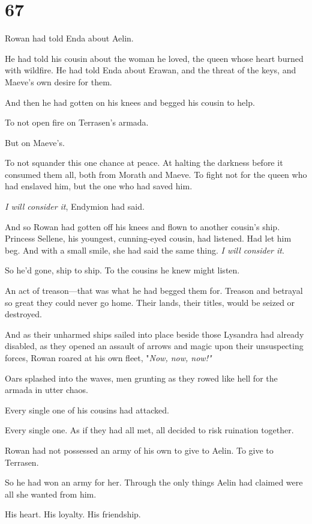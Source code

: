 
\chapter{67}

Rowan had told Enda about Aelin.

He had told his cousin about the woman he loved, the queen whose heart burned with wildfire. He had told Enda about Erawan, and the threat of the keys, and Maeve's own desire for them.

And then he had gotten on his knees and begged his cousin to help.

To not open fire on Terrasen's armada.

But on Maeve's.

To not squander this one chance at peace. At halting the darkness before it consumed them all, both from Morath and Maeve. To fight not for the queen who had enslaved him, but the one who had saved him.

\emph{I will consider it}, Endymion had said.

And so Rowan had gotten off his knees and flown to another cousin's ship. Princess Sellene, his youngest, cunning-eyed cousin, had listened. Had let him beg. And with a small smile, she had said the same thing.
\emph{I will consider it}.

So he'd gone, ship to ship. To the cousins he knew might listen.

An act of treason---that was what he had begged them for. Treason and betrayal so great they could never go home. Their lands, their titles, would be seized or destroyed.

And as their unharmed ships sailed into place beside those Lysandra had already disabled, as they opened an assault of arrows and magic upon their unsuspecting forces, Rowan roared at his own fleet, "\emph{Now, now, now!"}

Oars splashed into the waves, men grunting as they rowed like hell for the armada in utter chaos.

Every single one of his cousins had attacked.

Every single one. As if they had all met, all decided to risk ruination together.

Rowan had not possessed an army of his own to give to Aelin. To give to Terrasen.

So he had won an army for her. Through the only things Aelin had claimed were all she wanted from him.

His heart. His loyalty. His friendship.


